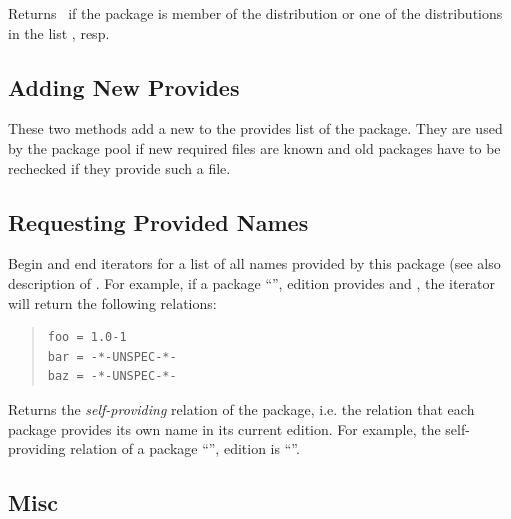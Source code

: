 \documentclass[10pt]{article}
\begin{document}
Returns \true\ if the package is member of the distribution 
or one of the distributions in the list , resp.



\subsection{Adding New Provides}

These two methods add a new 
to the provides list of the package. They are used by the package pool
if new required files are known and old packages have to be rechecked
if they provide such a file.


\subsection{Requesting Provided Names}

Begin and end iterators for a list of all names provided by this
package (see also description of . For
example, if a package ``'', edition  provides
 and , the iterator will return the following
relations:
\begin{quote}
\begin{verbatim}
foo = 1.0-1
bar = -*-UNSPEC-*-
baz = -*-UNSPEC-*-
\end{verbatim}
\end{quote}

Returns the {\em self-providing} relation of the package, i.e. the
relation that each package provides its own name in its current
edition. For example, the self-providing relation of a package
``'', edition  is ``''.



\subsection{Misc}
\end{document}
